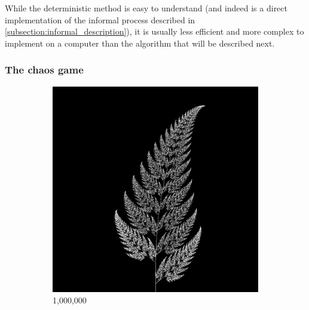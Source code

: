 \documentclass[11pt]{article}
\begin{document}
While the deterministic method is easy to understand (and indeed is a direct implementation of the informal process described in \autoref{subsection:informal_description}),
it is usually less efficient and more complex to implement on a computer than the algorithm that will be described next.

\subsubsection{The chaos game}
\label{sec:orgf584cbb}
\label{subsection:chaos_game}

\begin{figure}
     \centering
     \begin{subfigure}[b]{0.4\textwidth}
         \centering
         \includegraphics[width=\textwidth]{figures/barnsley_1000000}
         \caption{1,000,000}
         \label{figure:barnsley_mil}
     \end{subfigure}
     \hfill
     \begin{subfigure}[b]{0.4\textwidth}
         \centering

\end{subfigure}
\end{figure}
\end{document}
